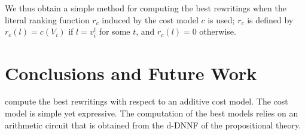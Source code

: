 \documentclass{article}
\begin{document}
{We thus obtain a simple method for computing the best
rewritings when the literal ranking function $r_c$ induced
by the cost model $c$ is used; $r_c$ is defined by
$r_c(l)=c(V_i)$ if $l=v^t_i$ for some $t$, and $r_c(l)=0$
otherwise.


\section{Conclusions and Future Work}

compute the best rewritings with respect to an additive
cost model. The cost model is simple yet expressive.
The computation of the best models relies on an arithmetic
circuit that is obtained from the d-DNNF of the propositional
theory.
}




\tableofcontents
\newpage









\end{document}
